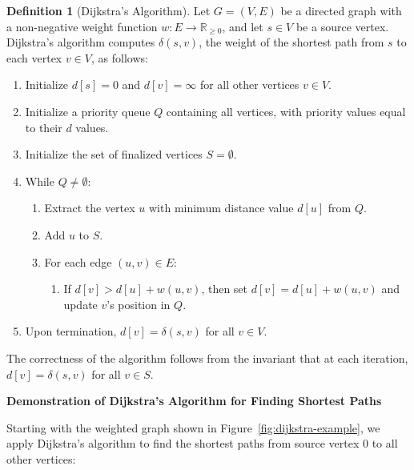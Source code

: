 \documentclass{article}
\theoremstyle{definition}
\newtheorem{definition}{Definition}
\begin{document}
\begin{definition}[Dijkstra's Algorithm]
Let $G = (V, E)$ be a directed graph with a non-negative weight function $w: E \rightarrow \mathbb{R}_{\geq 0}$, and let $s \in V$ be a source vertex. Dijkstra's algorithm computes $\delta(s, v)$, the weight of the shortest path from $s$ to each vertex $v \in V$, as follows:

\begin{enumerate}
\item Initialize $d[s] = 0$ and $d[v] = \infty$ for all other vertices $v \in V$.
\item Initialize a priority queue $Q$ containing all vertices, with priority values equal to their $d$ values.
\item Initialize the set of finalized vertices $S = \emptyset$.
\item While $Q \neq \emptyset$:
  \begin{enumerate}
    \item Extract the vertex $u$ with minimum distance value $d[u]$ from $Q$.
    \item Add $u$ to $S$.
    \item For each edge $(u, v) \in E$:
      \begin{enumerate}
        \item If $d[v] > d[u] + w(u, v)$, then set $d[v] = d[u] + w(u, v)$ and update $v$'s position in $Q$.
      \end{enumerate}
  \end{enumerate}
\item Upon termination, $d[v] = \delta(s, v)$ for all $v \in V$.
\end{enumerate}

\noindent The correctness of the algorithm follows from the invariant that at each iteration, $d[v] = \delta(s, v)$ for all $v \in S$.
\end{definition}

\noindent\textbf{Demonstration of Dijkstra's Algorithm for Finding Shortest Paths}

Starting with the weighted graph shown in Figure~\ref{fig:dijkstra-example}, we apply Dijkstra's algorithm to find the shortest paths from source vertex 0 to all other vertices:
\end{document}
